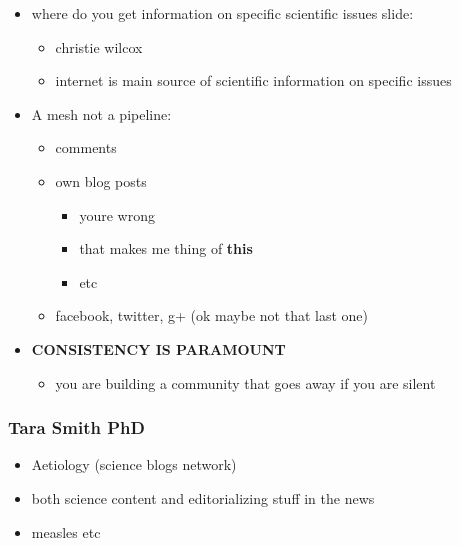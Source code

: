 \documentclass[letterpaper]{scrartcl}
\begin{document}
\begin{itemize}
\itemsep1pt\parskip0pt
\item
  where do you get information on specific scientific issues slide:

  \begin{itemize}
  \itemsep1pt\parskip0pt
  \item
    christie wilcox
  \item
    internet is main source of scientific information on specific issues
  \end{itemize}
\item
  A mesh not a pipeline:

  \begin{itemize}
  \itemsep1pt\parskip0pt
  \item
    comments
  \item
    own blog posts

    \begin{itemize}
    \itemsep1pt\parskip0pt
    \item
      youre wrong
    \item
      that makes me thing of \textbf{this}
    \item
      etc
    \end{itemize}
  \item
    facebook, twitter, g+ (ok maybe not that last one)
  \end{itemize}
\item
  \textbf{CONSISTENCY IS PARAMOUNT}

  \begin{itemize}
  \itemsep1pt\parskip0pt
  \item
    you are building a community that goes away if you are silent
  \end{itemize}
\end{itemize}

\subsubsection{Tara Smith PhD}\label{tara-smith-phd}

\begin{itemize}
\itemsep1pt\parskip0pt
\item
  Aetiology (science blogs network)
\item
  both science content and editorializing stuff in the news
\item
  measles etc
\end{itemize}
\end{document}
